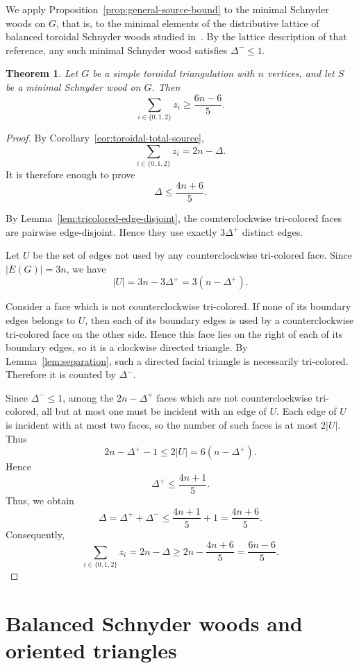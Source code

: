 \documentclass[11pt]{amsart}
\newcommand{\Zthree}{\{0,1,2\}}
\theoremstyle{plain}
\newtheorem{theorem}{Theorem}
\theoremstyle{definition}
\theoremstyle{remark}
\begin{document}
We apply Proposition~\ref{prop:general-source-bound} to the minimal Schnyder woods on $G$, that is, to the minimal elements of the distributive lattice of balanced toroidal Schnyder woods studied in~\cite{despre-goncalves-leveque2017}. By the lattice description of that reference, any such minimal Schnyder wood satisfies $\Delta^- \leq 1$.

\begin{theorem}
\label{thm:toroidal-lower-bound}
Let \(G\) be a simple toroidal triangulation with \(n\) vertices, and let \(S\)
be a minimal Schnyder wood on \(G\). Then
\[
  \sum_{i\in\Zthree} z_i \geq \frac{6n-6}{5}.
\]
\end{theorem}
\begin{proof}
By Corollary~\ref{cor:toroidal-total-source},
\[
  \sum_{i\in\Zthree} z_i = 2n-\Delta.
\]
It is therefore enough to prove
\[
  \Delta \leq \frac{4n+6}{5}.
\]

By Lemma~\ref{lem:tricolored-edge-disjoint}, the counterclockwise tri-colored faces
are pairwise edge-disjoint. Hence they use exactly \(3\Delta^+\) distinct edges.

Let \(U\) be the set of edges not used by any counterclockwise tri-colored face. Since
\(|E(G)|=3n\), we have
\[
  |U|=3n-3\Delta^+=3(n-\Delta^+).
\]

Consider a face which is not counterclockwise tri-colored. If none of its boundary
edges belongs to \(U\), then each of its boundary edges is used by a counterclockwise
tri-colored face on the other side. Hence this face lies on the right of each of its
boundary edges, so it is a clockwise directed triangle. By Lemma~\ref{lem:separation},
such a directed facial triangle is necessarily tri-colored. Therefore it is counted by
\(\Delta^-\).

Since \(\Delta^-\leq 1\), among the \(2n-\Delta^+\) faces which are not
counterclockwise tri-colored, all but at most one must be incident with an edge of
\(U\). Each edge of \(U\) is incident with at most two faces, so the number of such
faces is at most \(2|U|\). Thus
\[
  2n-\Delta^+-1 \leq 2|U|=6(n-\Delta^+).
\]
Hence
\[
  \Delta^+\leq \frac{4n+1}{5}.
\]
Thus, we obtain
\[
  \Delta
  =
  \Delta^+ + \Delta^-
  \leq
  \frac{4n+1}{5}+1
  =
  \frac{4n+6}{5}.
\]
Consequently,
\[
  \sum_{i\in\Zthree} z_i
  =
  2n-\Delta
  \geq
  2n-\frac{4n+6}{5}
  =
  \frac{6n-6}{5}.
\]
\end{proof}




\section{Balanced Schnyder woods and oriented triangles}
\label{sec:balanced-triangles}
\end{document}
